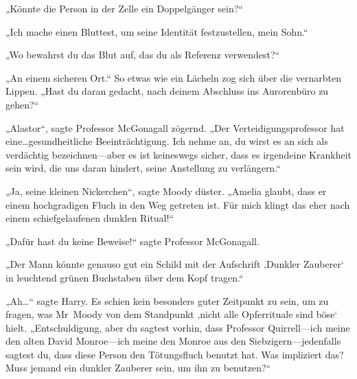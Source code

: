 „Könnte die Person in der Zelle ein Doppelgänger sein?“

„Ich mache einen Bluttest, um seine Identität festzustellen, mein Sohn.“

„Wo bewahrst du das Blut auf, das du als Referenz verwendest?“

„An einem sicheren Ort.“ So etwas wie ein Lächeln zog sich über die vernarbten Lippen. „Hast du daran gedacht, nach deinem Abschluss ins Aurorenbüro zu gehen?“

„Alastor“, sagte Professor McGonagall zögernd. „Der Verteidigungsprofessor hat eine…gesundheitliche Beeinträchtigung. Ich nehme an, du wirst es an sich als verdächtig bezeichnen—aber es ist keineswegs sicher, dass es irgendeine Krankheit sein wird, die uns daran hindert, seine Anstellung zu verlängern.“

„Ja, seine kleinen Nickerchen“, sagte Moody düster. „Amelia glaubt, dass er einem hochgradigen Fluch in den Weg getreten ist. Für mich klingt das eher nach einem schiefgelaufenen dunklen Ritual!“

„Dafür hast du keine Beweise!“ sagte Professor McGonagall.

„Der Mann könnte genauso gut ein Schild mit der Aufschrift ‚Dunkler Zauberer‘ in leuchtend grünen Buchstaben über dem Kopf tragen.“

„Ah…“ sagte Harry. Es schien kein besonders guter Zeitpunkt zu sein, um zu fragen, was Mr~Moody von dem Standpunkt ‚nicht alle Opferrituale sind böse‘ hielt. „Entschuldigung, aber du sagtest vorhin, dass Professor Quirrell—ich meine den alten David Monroe—ich meine den Monroe aus den Siebzigern—jedenfalls sagtest du, dass diese Person den Tötungsfluch benutzt hat. Was impliziert das? Muss jemand ein dunkler Zauberer sein, um ihn zu benutzen?“

